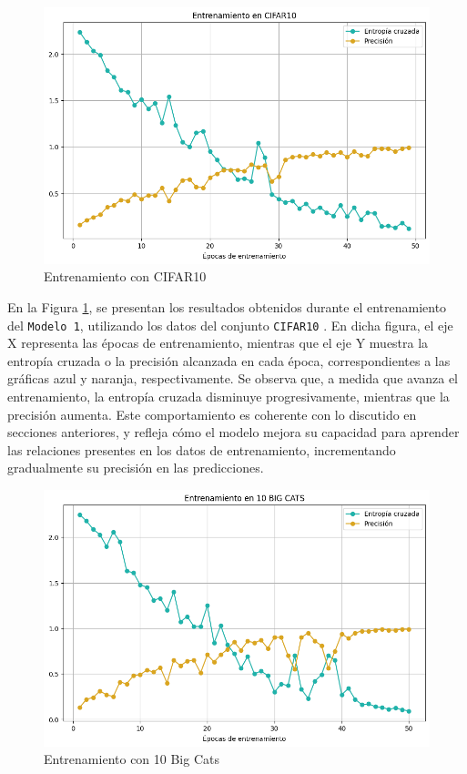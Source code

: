 \begin{figure}[H]
	\centering
	\includegraphics[scale=0.5]{imagenes/cifar10.png}  
	\caption{Entrenamiento con CIFAR10}
	\label{fig:cifar10}
\end{figure}

En la Figura \ref{fig:cifar10}, se presentan los resultados obtenidos durante el entrenamiento del \texttt{Modelo 1}, utilizando los datos del conjunto \texttt{CIFAR10} \cite{cifar10}. En dicha figura, el eje X representa las épocas de entrenamiento, mientras que el eje Y muestra la entropía cruzada o la precisión alcanzada en cada época, correspondientes a las gráficas azul y naranja, respectivamente. Se observa que, a medida que avanza el entrenamiento, la entropía cruzada disminuye progresivamente, mientras que la precisión aumenta. Este comportamiento es coherente con lo discutido en secciones anteriores, y refleja cómo el modelo mejora su capacidad para aprender las relaciones presentes en los datos de entrenamiento, incrementando gradualmente su precisión en las predicciones. 

\begin{figure}[H]
	\centering
	\includegraphics[scale=0.5]{imagenes/10_big_cats.png}  
	\caption{Entrenamiento con 10 Big Cats}
	\label{fig:10_big_cats}
\end{figure}

